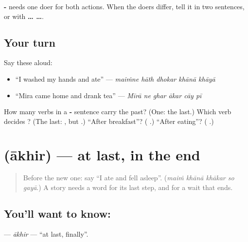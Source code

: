 \textbf{-} needs one doer for both actions. When the doers differ, tell it in two sentences, or with \textbf{ …  …}.

\subsection*{Your turn}
Say these aloud:

\begin{itemize}
\raggedright
  \item \textquotedblleft{}I washed my hands and ate\textquotedblright{} — \emph{maiṁne hāth dhokar khānā khāyā}
  \item \textquotedblleft{}Mira came home and drank tea\textquotedblright{} — \emph{Mīrā ne ghar ākar cāy pī}
\end{itemize}

\begin{tcolorbox}[breakable,colback=teal!4,colframe=teal!35!black,title={Before you move on}]
How many verbs in a \textbf{-} sentence carry the past? (One: the last.) Which verb decides \textbf{}? (The last: \textbf{    }, but \textbf{    }.) \textquotedblleft{}After breakfast\textquotedblright{}? (\textbf{  }.) \textquotedblleft{}After eating\textquotedblright{}? (\textbf{   }.)
\end{tcolorbox}
\section[\texorpdfstring{\hi{आख़िर} (ākhir)}{आख़िर (ākhir)}]{ (ākhir) — at last, in the end}

\label{lesson:HI-C279-akhir}



\begin{quote}
Before the new one: say \textquotedblleft{}I ate and fell asleep\textquotedblright{}. (\emph{maiṁ khānā khākar so gayā}.) A story needs a word for its last step, and for a wait that ends.
\end{quote}

\subsection*{You'll want to know: }
\textbf{} — \emph{ākhir} — \textquotedblleft{}at last, finally\textquotedblright{}.

